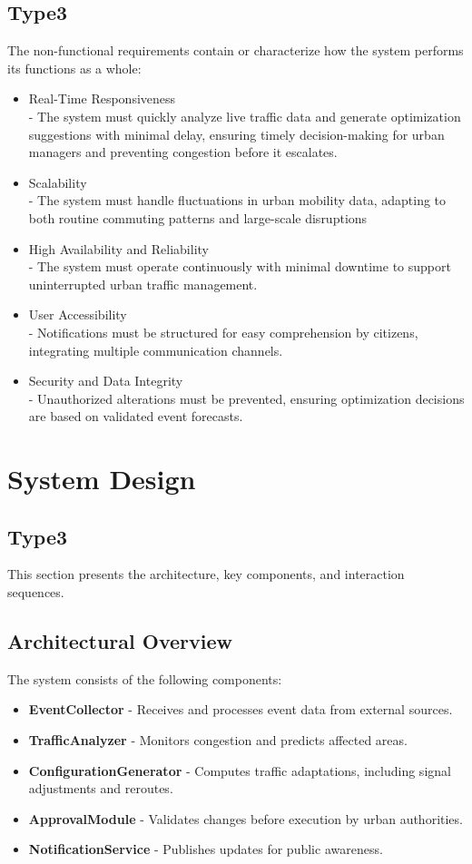 \documentclass[a4paper,12pt]{article}
\begin{document}
\subsection*{Type3}
The non-functional requirements contain or characterize how the system performs its functions as a whole:
\begin{itemize}
    \item{Real-Time Responsiveness} 
    \\- The system must quickly analyze live traffic data and generate optimization suggestions with minimal delay, ensuring timely decision-making for urban managers and preventing congestion before it escalates.
    \item{Scalability} 
    \\- The system must handle fluctuations in urban mobility data, adapting to both routine commuting patterns and large-scale disruptions
    \item{High Availability and Reliability}
    \\- The system must operate continuously with minimal downtime to support uninterrupted urban traffic management.
    \item{User Accessibility} 
    \\- Notifications must be structured for easy comprehension by citizens, integrating multiple communication channels.
    \item{Security and Data Integrity} 
    \\- Unauthorized alterations must be prevented, ensuring optimization decisions are based on validated event forecasts.
\end{itemize}

\newpage

\section{System Design}
\subsection*{Type3}
This section presents the architecture, key components, and interaction sequences.

\subsection{Architectural Overview}
The system consists of the following components:
\begin{itemize}
    \item \textbf{EventCollector} - Receives and processes event data from external sources.
    \item \textbf{TrafficAnalyzer} - Monitors congestion and predicts affected areas.
    \item \textbf{ConfigurationGenerator} - Computes traffic adaptations, including signal adjustments and reroutes.
    \item \textbf{ApprovalModule} - Validates changes before execution by urban authorities.
    \item \textbf{NotificationService} - Publishes updates for public awareness.
\end{itemize}
\end{document}
